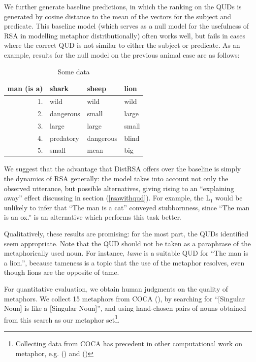\documentclass[10pt,letterpaper,twocolumn]{article}
\begin{document}
We further generate baseline predictions, in which the ranking on the QUDs is generated by cosine distance to the mean of the vectors for the subject and predicate. This baseline model (which serves as a null model for the usefulness of RSA in modelling metaphor distributionally) often works well, but fails in cases where the correct QUD is not similar to either the subject or predicate. As an example, results for the null model on the previous animal case are as follows:

\begin{table}[ht]
	\label{tab:bar}
	\caption{Some data}
	\centering
	\begin{tabular}{rlll}
	man (is a) & shark & sheep & lion \\\toprule
	1. & wild & wild & wild \\
	2. & dangerous & small & large \\
	3. & large & large & small \\
	4. & predatory & dangerous & blind \\
	5. & small & mean & big \\\bottomrule
	\end{tabular}
\end{table}

We suggest that the advantage that DistRSA offers over the baseline is simply the dynamics of RSA generally: the model takes into account not only the observed utterance, but possible alternatives, giving rising to an ``explaining away'' effect discussing in section (\ref{rsawithqud}). For example, the L$_1$ would be unlikely to infer that ``The man is a cat'' conveyed stubbornness, since ``The man is an ox.'' is an alternative which performs this task better.

Qualitatively, these results are promising: for the most part, the QUDs identified seem appropriate. Note that the QUD should not be taken as a paraphrase of the metaphorically used noun. For instance, \emph{tame} is a suitable QUD for ``The man is a lion.'', because tameness is a topic that the use of the metaphor resolves, even though lions are the opposite of tame. 

For quantitative evaluation, we obtain human judgments on the quality of metaphors. We collect 15 metaphors from COCA (\cite{davies2008corpus}), by searching for ``[Singular Noun] is like a [Singular Noun]'', and using hand-chosen pairs of nouns obtained from this search as our metaphor set\footnote{Collecting data from COCA has precedent in other computational work on metaphor, e.g. (\cite{neuman2013metaphor}) and (\cite{turney2011literal})}.
\end{document}
